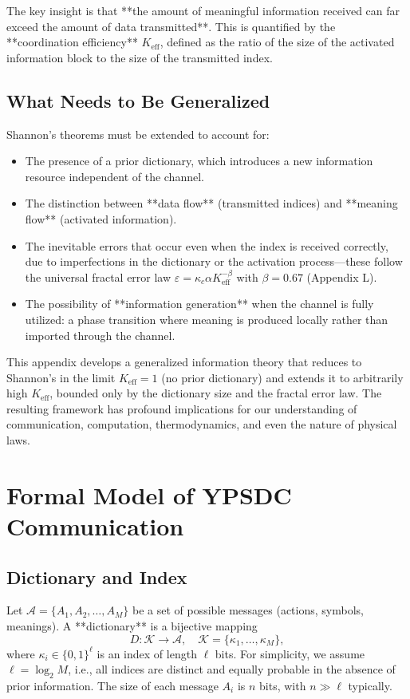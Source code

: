 \documentclass[12pt,a4paper]{article}
\theoremstyle{remark}
\newcommand{\Keff}{K_{\mathrm{eff}}}
\begin{document}
	The key insight is that **the amount of meaningful information received can far exceed the amount of data transmitted**. This is quantified by the **coordination efficiency** $\Keff$, defined as the ratio of the size of the activated information block to the size of the transmitted index.
	
	\subsection{What Needs to Be Generalized}
	
	Shannon's theorems must be extended to account for:
	\begin{itemize}
		\item The presence of a prior dictionary, which introduces a new information resource independent of the channel.
		\item The distinction between **data flow** (transmitted indices) and **meaning flow** (activated information).
		\item The inevitable errors that occur even when the index is received correctly, due to imperfections in the dictionary or the activation process—these follow the universal fractal error law $\varepsilon = \kappa_c \alpha \Keff^{-\beta}$ with $\beta = 0.67$ (Appendix L).
		\item The possibility of **information generation** when the channel is fully utilized: a phase transition where meaning is produced locally rather than imported through the channel.
	\end{itemize}
	
	This appendix develops a generalized information theory that reduces to Shannon's in the limit $\Keff = 1$ (no prior dictionary) and extends it to arbitrarily high $\Keff$, bounded only by the dictionary size and the fractal error law. The resulting framework has profound implications for our understanding of communication, computation, thermodynamics, and even the nature of physical laws.
	
	\section{Formal Model of YPSDC Communication}
	\label{sec:model}
	
	\subsection{Dictionary and Index}
	
	Let $\mathcal{A} = \{A_1, A_2, \dots, A_M\}$ be a set of possible messages (actions, symbols, meanings). A **dictionary** is a bijective mapping
	\begin{equation}
		D: \mathcal{K} \to \mathcal{A}, \quad \mathcal{K} = \{\kappa_1, \dots, \kappa_M\},
	\end{equation}
	where $\kappa_i \in \{0,1\}^\ell$ is an index of length $\ell$ bits. For simplicity, we assume $\ell = \log_2 M$, i.e., all indices are distinct and equally probable in the absence of prior information. The size of each message $A_i$ is $n$ bits, with $n \gg \ell$ typically.
	
\end{document}
